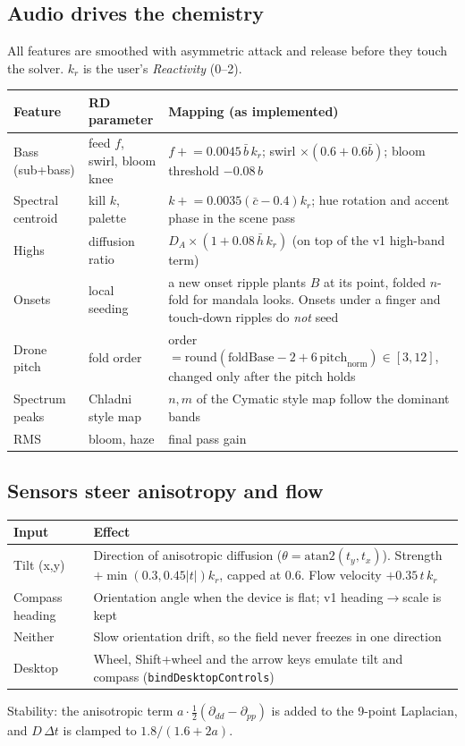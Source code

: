 \documentclass[10pt,a4paper]{article}
\newcommand{\code}[1]{\texttt{\small #1}}
\begin{document}
\subsection{Audio drives the chemistry}
All features are smoothed with asymmetric attack and release before they touch the solver.
$k_r$ is the user's \emph{Reactivity} (0--2).

\begin{center}\small
\begin{tabularx}{\linewidth}{@{}l L L@{}}
\toprule
Feature & RD parameter & Mapping (as implemented)\\
\midrule
Bass (sub+bass) & feed $f$, swirl, bloom knee & $f \mathrel{+}= 0.0045\,\bar b\,k_r$; swirl $\times(0.6+0.6\bar b)$; bloom threshold $-0.08\,b$\\
Spectral centroid & kill $k$, palette & $k \mathrel{+}= 0.0035(\bar c-0.4)k_r$; hue rotation and accent phase in the scene pass\\
Highs & diffusion ratio & $D_A \times (1+0.08\,\bar h\,k_r)$ (on top of the v1 high-band term)\\
Onsets & local seeding & a new onset ripple plants $B$ at its point, folded $n$-fold for mandala looks. Onsets under a finger and touch-down ripples do \emph{not} seed\\
Drone pitch & fold order & order $=\mathrm{round}(\text{foldBase}-2+6\,\text{pitch}_{\text{norm}})\in[3,12]$, changed only after the pitch holds\\
Spectrum peaks & Chladni style map & $n,m$ of the Cymatic style map follow the dominant bands\\
RMS & bloom, haze & final pass gain\\
\bottomrule
\end{tabularx}\end{center}

\subsection{Sensors steer anisotropy and flow}
\begin{center}\small
\begin{tabularx}{\linewidth}{@{}l L@{}}
\toprule
Input & Effect\\
\midrule
Tilt (x,y) & Direction of anisotropic diffusion ($\theta=\mathrm{atan2}(t_y,t_x)$). Strength $+\min(0.3,0.45|t|)k_r$, capped at 0.6. Flow velocity $+0.35\,t\,k_r$\\
Compass heading & Orientation angle when the device is flat; v1 heading$\to$scale is kept\\
Neither & Slow orientation drift, so the field never freezes in one direction\\
Desktop & Wheel, Shift+wheel and the arrow keys emulate tilt and compass (\code{bindDesktopControls})\\
\bottomrule
\end{tabularx}\end{center}
Stability: the anisotropic term $a\cdot\tfrac12(\partial_{dd}-\partial_{pp})$ is added to the 9-point
Laplacian, and $D\,\Delta t$ is clamped to $1.8/(1.6+2a)$.
\end{document}
